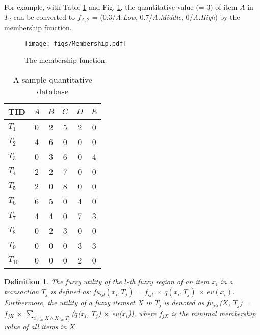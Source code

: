 \documentclass[journal]{IEEEtran}
\newtheorem{definition}{Definition}[section]
\begin{document}
For example, with Table \ref{tab:database} and Fig. \ref{fig:Membership}, the quantitative value (= 3) of item $A$ in $T_2$ can be converted to $f_{A, 2}$ = (0.3/\textit{A.Low}, 0.7/\textit{A.Middle}, 0/\textit{A.High}) by the membership function.

\begin{figure}[hbt]
	\centering
	\texttt{[image: figs/Membership.pdf]}
	\caption{The membership function.}
	\label{fig:Membership}
\end{figure}


\begin{table}[!h]
	\begin{center}
		\caption{A sample quantitative database}
		\label{tab:database}
		\begin{tabular}{lccccc}
			\hline
			\textbf{TID} & $A$ & $B$ & $C$ & $D$ & $E$ \\ \hline
			$T_1$         & 0 & 2 & 5 & 2 & 0 \\
			$T_2$         & 4 & 6 & 0 & 0 & 0 \\
			$T_3$         & 0 & 3 & 6 & 0 & 4 \\
			$T_4$         & 2 & 2 & 7 & 0 & 0 \\
			$T_5$         & 2 & 0 & 8 & 0 & 0 \\
			$T_6$         & 6 & 5 & 0 & 4 & 0 \\
			$T_7$         & 4 & 4 & 0 & 7 & 3 \\
			$T_8$         & 0 & 2 & 3 & 0 & 0 \\
			$T_9$         & 0 & 0 & 0 & 3 & 3 \\
			$T_{10}$      & 0 & 0 & 0 & 2 & 0 \\ \hline
		\end{tabular}
	\end{center}
\end{table}


\begin{definition}
	\rm  The fuzzy utility of the $l$-th fuzzy region of an item $x_i$ in a transaction $T_j$ is defined as: \textit{fu}$_{ijl}(x_i, T_j)$ = $f_{ijl}$ $\times $ $q(x_i, T_j)$ $\times$ \textit{eu}$(x_i)$. Furthermore, the utility of a fuzzy itemset $X$ in $T_j$ is denoted as \textit{fu}$_{jX}$($X$, $T_j$) = $f_{jX}$ $\times$ $\sum_{x_i \subseteq X \land X \subseteq T_j}$($q$($x_i$, $T_j$) $\times$ \textit{eu}($x_i$)), where $f_{jX}$ is the minimal membership value of all items in $X$.
\end{definition}
\end{document}
